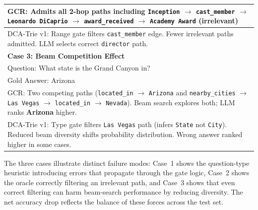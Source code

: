 \begin{table}[H]
\begin{tabularx}{\textwidth}{|X|}
    GCR: Admits all 2-hop paths including \texttt{Inception} $\to$ \texttt{cast\_member} $\to$ \texttt{Leonardo DiCaprio} $\to$ \texttt{award\_received} $\to$ \texttt{Academy Award} (irrelevant)                                              \\
    \hline
    DCA-Trie v1: Range gate filters \texttt{cast\_member} edge. Fewer irrelevant paths admitted. LLM selects correct \texttt{director} path.                                                                                                    \\
    \hline
    \textbf{Case 3: Beam Competition Effect}                                                                                                                                                                                                    \\
    \hline
    Question: What state is the Grand Canyon in?                                                                                                                                                                                                \\
    Gold Answer: Arizona                                                                                                                                                                                                                        \\
    \hline
    GCR: Two competing paths (\texttt{located\_in} $\to$ \texttt{Arizona} and \texttt{nearby\_cities} $\to$ \texttt{Las Vegas} $\to$ \texttt{located\_in} $\to$ \texttt{Nevada}). Beam search explores both; LLM ranks \textbf{Arizona} higher. \\
    \hline
    DCA-Trie v1: Type gate filters \texttt{Las Vegas} path (infers \texttt{State} not \texttt{City}). Reduced beam diversity shifts probability distribution. Wrong answer ranked higher in some cases.                                         \\
    \hline
  \end{tabularx}
\end{table}

The three cases illustrate distinct failure modes: Case~1 shows the question-type heuristic introducing errors that propagate through the gate logic, Case~2 shows the oracle correctly filtering an irrelevant path, and Case~3 shows that even correct filtering can harm beam-search performance by reducing diversity. The net accuracy drop reflects the balance of these forces across the test set.

